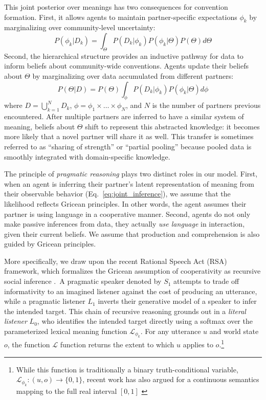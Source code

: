 This joint posterior over meanings has two consequences for convention formation.
First, it allows agents to maintain partner-specific expectations $\phi_k$ by marginalizing over community-level uncertainty:
\begin{equation}
P(\phi_k | D_k) = \int_{\Theta}P(D_k | \phi_k) P(\phi_k | \Theta) P(\Theta)  d\Theta
\end{equation}
Second, the hierarchical structure provides an inductive pathway for data to inform beliefs about community-wide conventions.
Agents update their beliefs about $\Theta$ by marginalizing over data accumulated from different partners:
\begin{equation}
P(\Theta | D) = P(\Theta) \int_{\phi} P(D_k | \phi_k) P(\phi_k | \Theta) d\phi
\end{equation}
where $D = \bigcup_{k=1}^N D_k$, $\phi = \phi_1 \times \dots \times \phi_N$, and $N$ is the number of partners previous encountered. 
After multiple partners are inferred to have a similar system of meaning, beliefs about $\Theta$ shift to represent this abstracted knowledge: it becomes more likely that a novel partner will share it as well.
This transfer is sometimes referred to as ``sharing of strength'' or ``partial pooling'' because pooled data is smoothly integrated with domain-specific knowledge.

The principle of \textit{pragmatic reasoning} plays two distinct roles in our model.
First, when an agent is inferring their partner's latent representation of meaning from their observable behavior (Eq.~\ref{eq:joint_inference}), we assume that the likelihood reflects Gricean principles.
In other words, the agent assumes their partner is using language in a cooperative manner.
Second, agents do not only make passive inferences from data, they actually \emph{use language} in interaction, given their current beliefs.
We assume that production and comprehension is also guided by Gricean principles.

More specifically, we draw upon the recent Rational Speech Act (RSA) framework, which formalizes the Gricean assumption of cooperativity as recursive social inference \cite{frank_predicting_2012,goodman_pragmatic_2016,FrankeJager16_ProbabilisticPragmatics}.~A pragmatic speaker denoted by $S_1$ attempts to trade off informativity to an imagined listener against the cost of producing an utterance, while a pragmatic listener $L_1$ inverts their generative model of a speaker to infer the intended target.
This chain of recursive reasoning grounds out in a \emph{literal listener} $L_0$, who identifies the intended target directly using a softmax over the parameterized lexical meaning function $\mathcal{L}_{\phi_k}$.
For any utterance $u$ and world state $o$, the function $\mathcal{L}$ function returns the extent to which $u$ applies to $o$.\footnote{While this function is traditionally a binary truth-conditional variable, $\mathcal{L}_{\phi_k}: (u,o) \rightarrow \{0,1\}$, recent work has also argued for a continuous semantics mapping to the full real interval $[0,1]$  \cite{degen2020redundancy}}

